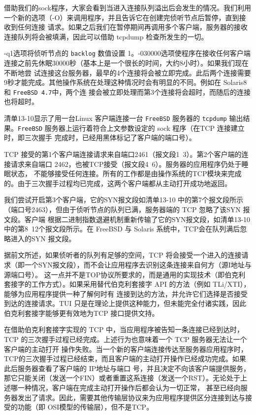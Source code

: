 借助我们的sock程序，大家会看到当进入连接队列溢出后会发生的情况。我们利用一个新的选项（-O）来调用程序，并且告诉它在创建完侦听节点后暂停，直到接收到任何连接
请求。如果之后我们在暂停期间再调用多个客户端，服务器的接收连接队列将会被填满，因此可以借助 tcpdump 检查所发生的一切。

-q1选项将侦听节点的 \verb|backlog| 数值设置 1。-030000选项使程序在接收任何客户端连接之前先休眠30000秒（基本上是一个很长的时间，大约8小时）。如果我们现在不断地尝
试连接这台服务器，最早的4个连接将会被立即完成。此后两个连接需要9秒才能完成。其他操作系统在处理这种情况时会有明显的不同。例如在 Solaris8和 \verb|FreeBSD 4.7|中，两个连
接会被立即处理而第3个连接将会超时，而随后的连接也将超时。

清单13-10显示了用一台Linux 客户端连接一台 \verb|FreeBSD| 服务器的 \verb|tcpdump| 输出结果。\verb|FreeBSD| 服务器上运行着符合上文参数设定的 sock 程序（在TCP 连接建立时，即三次握手
完成时，已经用黑体标记了客户端的端口号）。

TCP 接受的第1个客户端连接请求来自端口2461（报文段1~3）。第2个客户端的连接请求来自端口 2462，也被TCP接受（报文段4~6）。服务器的应用程序仍处于睡眠状态，
不能够接受任何连接。所有的工作都是由操作系统的TCP模块来完成的。由于三次握手过程均已完成，这两个客户端都从主动打开成功地返回。

我们尝试开启第3个客户端，它的SYN报文段如清单13-10 中的第7个报文段所示（端口号2463），但由于侦听节点的队列已满，服务器端的 TCP 忽略了该SYN 报文段。客户端
根据二进制指数退避机制重新传输了它的SYN报文段，如清单13-10中的第8~12个报文段所示。在 FreeBSD 与 Solaris 系统中，TCP会在队列满后忽略进入的SYN 报文段。

据前文所述，如果侦听者的队列有足够的空间，TCP 将会接受一个进入的连接请求（即一个SYN报文段），而不会让应用程序去识别这条连接来自何方（源I地址与源端口号）。
这一点并不是TOP协议所要求的，而是通用的实现技术（即伯克利套接字的工作方式）。如果采用替代伯克利套接字 API 的方法（例如 TLi/XTI），能够为应用程序提供一种了解何时有
连接到达的方法，并允许它们选择是否接受到达的连接请求。TUI 只是在理论上提供这种能力，但未能完全付诸实践，因此伯克利套接字能够更有效地为TCP 接口提供文持。

在借助伯克利套接字实现的 TCP 中，当应用程序被告知一条连接已经到达时，TCP 的三次握手过程已经完成。上述行为也意味着一个 TCP 服务器无法让一个客户端的主动打开
操作失败。当一个新的客户端连接传达至服务器应用程序时，TCP的三次握手过程已经结束，而且客户端的主动打开操作已经成功完成。如果此后服务器查看了客户端的 IP地址与端口
号，并且决定不向该客户端提供服务，那它只能关闭（发送一个FIN）或者重置这系连接（发送一个RST）。无论处于上述哪一种情况，客户端在完成主动打开操作后都会认为一切正常，
甚至已经向服务器发出了请求。因此，需要其他传输层协议来为应用程序提供区分连接到达与接受的功能（即 OSI模型的传输层），但不是TCP。
